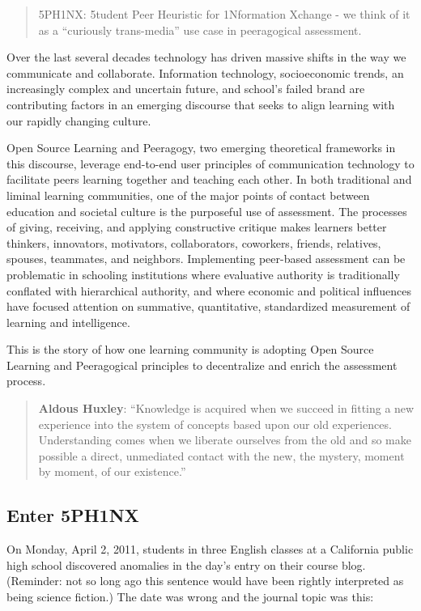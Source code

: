 %
\begin{quote}
5PH1NX: 5tudent Peer Heuristic for 1Nformation Xchange - we think of it
as a ``curiously trans-media'' use case in peeragogical assessment.
\end{quote}

Over the last several decades technology has driven massive shifts in
the way we communicate and collaborate. Information technology,
socioeconomic trends, an increasingly complex and uncertain future, and
school's failed brand are contributing factors in an emerging discourse
that seeks to align learning with our rapidly changing culture.

Open Source Learning and Peeragogy, two emerging theoretical frameworks
in this discourse, leverage end-to-end user principles of communication
technology to facilitate peers learning together and teaching each
other. In both traditional and liminal learning communities, one of the
major points of contact between education and societal culture is the
purposeful use of assessment. The processes of giving, receiving, and
applying constructive critique makes learners better thinkers,
innovators, motivators, collaborators, coworkers, friends, relatives,
spouses, teammates, and neighbors. Implementing peer-based assessment
can be problematic in schooling institutions where evaluative authority
is traditionally conflated with hierarchical authority, and where
economic and political influences have focused attention on summative,
quantitative, standardized measurement of learning and intelligence.

This is the story of how one learning community is adopting Open Source
Learning and Peeragogical principles to decentralize and enrich the
assessment process.

\begin{quote}
\textbf{Aldous Huxley}: ``Knowledge is acquired when we succeed in
fitting a new experience into the system of concepts based upon our
old experiences. Understanding comes when we liberate ourselves from
the old and so make possible a direct, unmediated contact with the
new, the mystery, moment by moment, of our existence.''
\end{quote}


\subsection{Enter 5PH1NX}

On Monday, April 2, 2011, students in three English classes at a
California public high school discovered anomalies in the day's entry on
their course blog. (Reminder: not so long ago this sentence would have
been rightly interpreted as being science fiction.) The date was wrong
and the journal topic was this:

